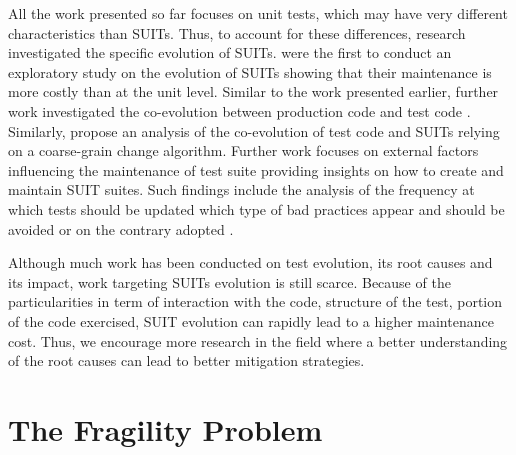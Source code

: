 All the work presented so far focuses on unit tests, which may have very different characteristics than SUITs. Thus, to account for these differences, research investigated the specific evolution of SUITs. \textcite{Skoglund2004} were the first to conduct an exploratory study on the evolution of SUITs showing that their maintenance is more costly than at the unit level. Similar to the work presented earlier, further work investigated the co-evolution between production code and test code \cite{Shewchuk2010}. Similarly, \textcite{Christophe2014} propose an analysis of the co-evolution of test code and SUITs relying on a coarse-grain change algorithm. Further work focuses on external factors influencing the maintenance of test suite \cite{Alegroth2013, Kan2013, Alegroth2016, Lavoie2017} providing insights on how to create and maintain SUIT suites. Such findings include the analysis of the frequency at which tests should be updated \cite{Alegroth2013, Alegroth2016} which type of bad practices appear and should be avoided \cite{Lavoie2017} or on the contrary adopted \cite{Kan2013}.

Although much work has been conducted on test evolution, its root causes and its impact, work targeting SUITs evolution is still scarce. Because of the particularities in term of interaction with the code, structure of the test, portion of the code exercised, SUIT evolution can rapidly lead to a higher maintenance cost. Thus, we encourage more research in the field where a better understanding of the root causes can lead to better mitigation strategies.


\section{The Fragility Problem}
\label{sec:related-fragility}

